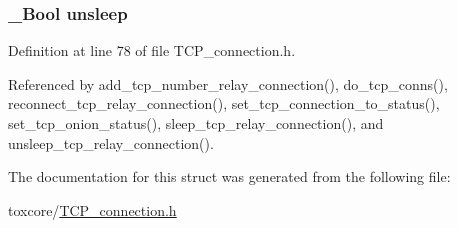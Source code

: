 \hypertarget{struct_t_c_p__con_a32a5683291c18bbe710881445071d607}{
\subsubsection[{unsleep}]{\setlength{\rightskip}{0pt plus 5cm}\+\_\+\+Bool unsleep}}\label{struct_t_c_p__con_a32a5683291c18bbe710881445071d607}


Definition at line 78 of file T\+C\+P\+\_\+connection.\+h.



Referenced by add\+\_\+tcp\+\_\+number\+\_\+relay\+\_\+connection(), do\+\_\+tcp\+\_\+conns(), reconnect\+\_\+tcp\+\_\+relay\+\_\+connection(), set\+\_\+tcp\+\_\+connection\+\_\+to\+\_\+status(), set\+\_\+tcp\+\_\+onion\+\_\+status(), sleep\+\_\+tcp\+\_\+relay\+\_\+connection(), and unsleep\+\_\+tcp\+\_\+relay\+\_\+connection().



The documentation for this struct was generated from the following file\+:\begin{DoxyCompactItemize}
\item 
toxcore/\hyperlink{_t_c_p__connection_8h}{T\+C\+P\+\_\+connection.\+h}\end{DoxyCompactItemize}
